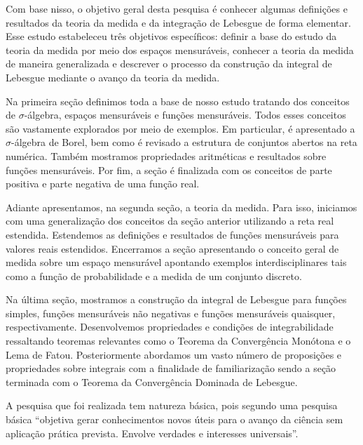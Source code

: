     Com base nisso, o objetivo geral desta pesquisa é conhecer algumas definições e resultados da teoria da medida e da integração de Lebesgue de forma elementar.
    Esse estudo estabeleceu três objetivos específicos: 
    definir a base do estudo da teoria da medida por meio dos espaços mensuráveis,
    conhecer a teoria da medida de maneira generalizada e descrever o processo da construção da integral de Lebesgue mediante o avanço da teoria da medida.
    
  	
  	Na primeira seção definimos toda a base de nosso estudo tratando dos conceitos de $\sigma$-álgebra, espaços mensuráveis e funções mensuráveis.
  	Todos esses conceitos são vastamente explorados por meio de exemplos.
  	Em particular, é apresentado a $\sigma$-álgebra de Borel, bem como é revisado a estrutura de conjuntos abertos na reta numérica.
  	Também mostramos propriedades aritméticas e resultados sobre funções mensuráveis.
  	Por fim, a seção é finalizada com os conceitos de parte positiva e parte negativa de uma função real.
  	
  	Adiante apresentamos, na segunda seção, a teoria da medida. 
  	Para isso, iniciamos com uma generalização dos conceitos da seção anterior utilizando a reta real estendida.
  	Estendemos as definições e resultados de funções mensuráveis para valores reais estendidos.
  	Encerramos a seção apresentando o conceito geral de medida sobre um espaço mensurável apontando exemplos interdisciplinares tais como a função de probabilidade e a medida de um conjunto discreto.
  	
  	Na última seção, mostramos a construção da integral de Lebesgue para funções simples, funções mensuráveis não negativas e funções mensuráveis quaisquer, respectivamente.
  	Desenvolvemos propriedades e condições de integrabilidade ressaltando teoremas relevantes como o Teorema da Convergência Monótona e o Lema de Fatou.
  	Posteriormente abordamos um vasto número de proposições e propriedades sobre integrais com a finalidade de familiarização sendo a seção terminada com o Teorema da Convergência Dominada de Lebesgue.
  	
  
  	
  	A pesquisa que foi realizada tem natureza básica, pois segundo \cite[p.51]{profreitas} uma pesquisa básica
  	\enquote{objetiva gerar conhecimentos novos úteis para o avanço da ciência sem aplicação prática prevista. Envolve verdades e interesses universais}. 
  	
